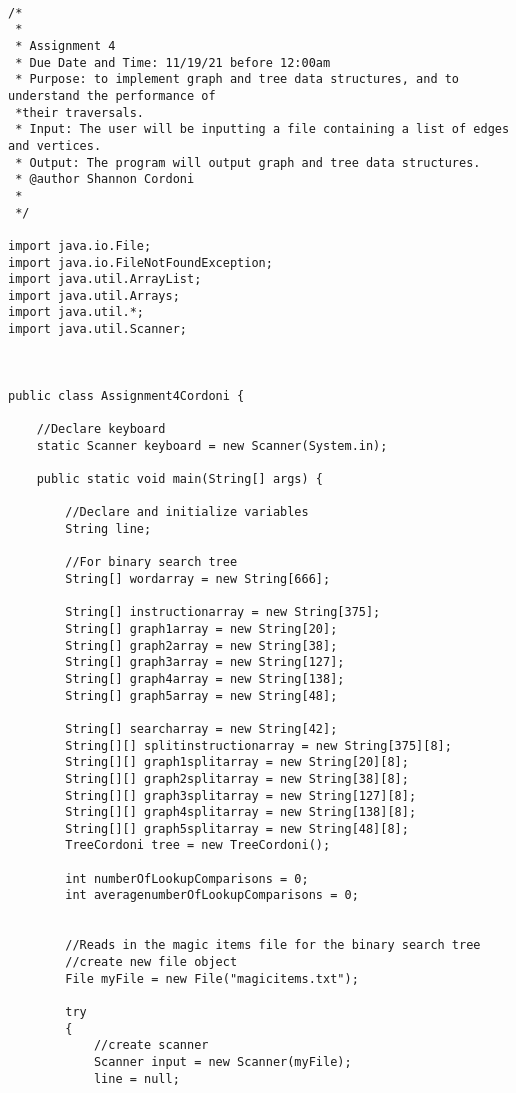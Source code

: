\documentclass[letterpaper, 10pt,DIV=13]{scrartcl}
\numberwithin{equation}{section} %
\numberwithin{figure}{section} %
\numberwithin{table}{section} %
\begin{document}
\lstset{numbers=left, numberstyle=\tiny, stepnumber=1, numbersep=5pt, basicstyle=\footnotesize\ttfamily}
\begin{lstlisting}[frame=single, ] 
   
/*
 * 
 * Assignment 4
 * Due Date and Time: 11/19/21 before 12:00am 
 * Purpose: to implement graph and tree data structures, and to understand the performance of 
 *their traversals.
 * Input: The user will be inputting a file containing a list of edges and vertices. 
 * Output: The program will output graph and tree data structures. 
 * @author Shannon Cordoni 
 * 
 */

import java.io.File;
import java.io.FileNotFoundException;
import java.util.ArrayList;
import java.util.Arrays;
import java.util.*;
import java.util.Scanner;



public class Assignment4Cordoni {

    //Declare keyboard 
    static Scanner keyboard = new Scanner(System.in);
    
    public static void main(String[] args) {

        //Declare and initialize variables 
        String line;

        //For binary search tree
        String[] wordarray = new String[666];
       
        String[] instructionarray = new String[375];
        String[] graph1array = new String[20];
        String[] graph2array = new String[38];
        String[] graph3array = new String[127];
        String[] graph4array = new String[138];
        String[] graph5array = new String[48];

        String[] searcharray = new String[42];
        String[][] splitinstructionarray = new String[375][8];
        String[][] graph1splitarray = new String[20][8];
        String[][] graph2splitarray = new String[38][8];
        String[][] graph3splitarray = new String[127][8];
        String[][] graph4splitarray = new String[138][8];
        String[][] graph5splitarray = new String[48][8];
        TreeCordoni tree = new TreeCordoni();
    
        int numberOfLookupComparisons = 0;
        int averagenumberOfLookupComparisons = 0;


        //Reads in the magic items file for the binary search tree
        //create new file object
        File myFile = new File("magicitems.txt");
        
        try
        {
            //create scanner
            Scanner input = new Scanner(myFile);
            line = null;
            

\end{lstlisting}
\end{document}
